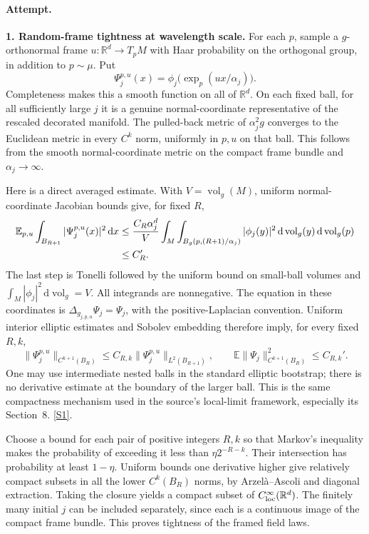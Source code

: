 \documentclass[11pt,a4paper]{article}
\newcommand{\R}{\mathbb{R}}
\newcommand{\E}{\mathbb{E}}
\newcommand{\dd}{\,\mathrm d}
\newcommand{\sref}[2]{\hyperlink{source:#1:#2}{[S#2]}}
\numberwithin{equation}{section}
\begin{document}
\paragraph{Attempt.}
\textbf{1. Random-frame tightness at wavelength scale.}
For each $p$, sample a $g$-orthonormal frame $u:\R^d\to T_pM$ with Haar
probability on the orthogonal group, in addition to $p\sim\mu$. Put
\[
 \Psi_j^{p,u}(x)=\phi_j\bigl(\exp_p(u x/\alpha_j)\bigr).
\]
Completeness makes this a smooth function on all of $\R^d$. On each fixed
ball, for all sufficiently large $j$ it is a genuine normal-coordinate
representative of the rescaled decorated manifold. The pulled-back
metric of $\alpha_j^2g$ converges to the Euclidean metric in every
$C^k$ norm, uniformly in $p,u$ on that ball. This follows from the smooth
normal-coordinate metric on the compact frame bundle and
$\alpha_j\to\infty$.

Here is a direct averaged estimate. With $V=\operatorname{vol}_g(M)$,
uniform normal-coordinate Jacobian bounds give, for fixed $R$,
\begin{align}
 \E_{p,u}\int_{B_{R+1}}|\Psi_j^{p,u}(x)|^2\dd x
 &\leq \frac{C_R\alpha_j^d}{V}
       \int_M\int_{B_g(p,(R+1)/\alpha_j)}|\phi_j(y)|^2
                                      \dd\operatorname{vol}_g(y)
                                      \dd\operatorname{vol}_g(p)
       \notag\\
 &\leq C_R'.\label{229:average}
\end{align}
The last step is Tonelli followed by the uniform bound on small-ball
volumes and $\int_M|\phi_j|^2\dd\operatorname{vol}_g=V$.
All integrands are nonnegative. The equation in these coordinates is
$\Delta_{g_{j,p,u}}\Psi_j=\Psi_j$, with the positive-Laplacian
convention. Uniform interior elliptic estimates and Sobolev embedding
therefore imply, for every fixed $R,k$,
\begin{equation}\label{229:regularity}
 \|\Psi_j^{p,u}\|_{C^{k+1}(B_R)}
       \leq C_{R,k}\|\Psi_j^{p,u}\|_{L^2(B_{R+1})},\qquad
 \E\|\Psi_j\|_{C^{k+1}(B_R)}^2\leq C_{R,k}'.
\end{equation}
One may use intermediate nested balls in the standard elliptic bootstrap;
there is no derivative estimate at the boundary of the larger ball.
This is the same compactness mechanism used in the source's local-limit
framework, especially its Section~8. \sref{229}{1}.

Choose a bound for each pair of positive integers $R,k$ so that Markov's
inequality makes the probability of exceeding it less than
$\eta 2^{-R-k}$. Their intersection has probability at least $1-\eta$.
Uniform bounds one derivative higher give relatively compact subsets in
all the lower $C^k(B_R)$ norms, by Arzel\`a--Ascoli and diagonal extraction.
Taking the closure yields a compact subset of $C^\infty_{\rm loc}(\R^d)$.
The finitely many initial $j$ can be included separately, since each is
a continuous image of the compact frame bundle. This proves tightness
of the framed field laws.
\end{document}
